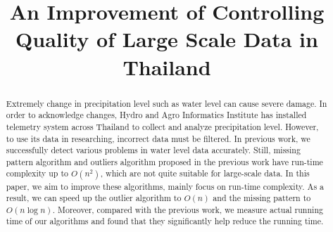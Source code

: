 \documentclass[conference]{IEEEtran}
\begin{document}
\title{An Improvement of Controlling\\Quality of Large Scale Data in Thailand}

\author{
\and
{}
\and
{}
}

\maketitle


\begin{abstract}
Extremely change in precipitation level such as water level can cause severe damage. In order to acknowledge changes, Hydro and Agro Informatics Institute has installed telemetry system across Thailand to collect and analyze precipitation level. However, to use its data in researching, incorrect data must be filtered. In previous work, we successfully detect various problems in water level data accurately. Still, missing pattern algorithm and outliers algorithm proposed in the previous work have run-time complexity up to $O(n^2)$, which are not quite suitable for large-scale data. In this paper, we aim to improve these algorithms, mainly focus on run-time complexity. As a result, we can speed up the outlier algorithm to $O(n)$ and the missing pattern to $O(n \log{n})$. Moreover, compared with the previous work, we measure actual running time of our algorithms and found that they significantly help reduce the running time.

\end{abstract}
\end{document}

